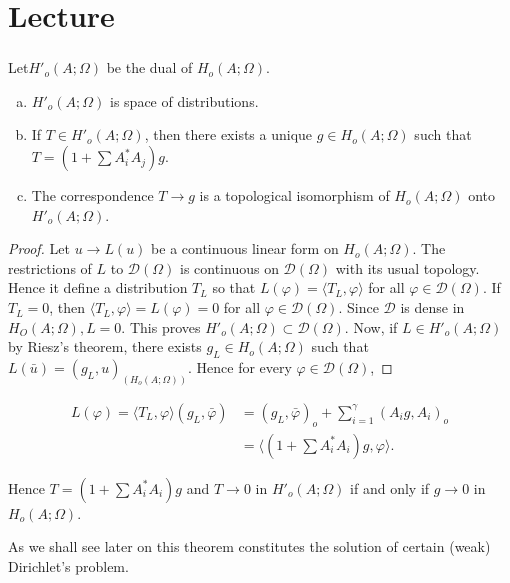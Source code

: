\chapter{Lecture}\label{lec2}

\setcounter{section}{1}

\subsection{}\label{lec2:sec1:subsec6}%

Let\pageoriginale $H'_o (A ; \Omega)$ be the dual of $H_o(A; \Omega)$. 

\setcounter{theorem}{2}
\begin{theorem}\label{lec2:sec1:subsec6:thm1.3}%
   \begin{enumerate}[a)]
   \item $H'_o (A; \Omega)$ is space of distributions.
   \item If $T \in H'_o (A ; \Omega)$, then there exists a
     unique $g \in H_o(A; \Omega)$ such that $T =(1+ \sum A^*_i
     A_j)g$. 
   \item The correspondence $T \to g$ is a topological isomorphism of
     $H_o (A; \Omega)$ onto $H'_o (A ; \Omega)$. 
   \end{enumerate}
\end{theorem}
\begin{proof}
Let $u \to L(u)$ be a continuous linear form on $H_o (A; \Omega)$. The
restrictions of $L$ to $\mathscr{D} (\Omega)$ is continuous on
$\mathscr{D}(\Omega)$ with its usual topology. Hence it define a
distribution $T_{L}$ so that $L(\varphi)= \langle T_L,
\varphi \rangle$ for all $\varphi \in \mathscr{D}(\Omega)$. If
$T_L=0$, then $\langle T_L, \varphi \rangle =L(\varphi)=0$ for all
$\varphi \in \mathscr{D}(\Omega)$. Since $\mathscr{D}$ is
dense in $H_O(A ; \Omega), L = 0$. This proves $H'_o (A ; \Omega)
\subset \mathscr{D} (\Omega)$. Now, if $L \in H'_o(A; \Omega)$
by Riesz's theorem, there exists $g_L \in H_o(A; \Omega)$ such
that $L (\bar{u})=(g_L,u)_{(H_o (A; \Omega))}$. Hence for every
$\varphi \in \mathscr{D}(\Omega)$, 
\end{proof}
\begin{align*}
L(\varphi)= \langle T_L, \varphi \rangle (g_L, \bar{\varphi})  &=(g_L,
\bar{\varphi})_o + \sum ^\gamma _{i=1} (A_i g,A_i)_o\\ 
&= \langle (1+ \sum A^*_i A_i)g, \varphi \rangle.
\end{align*}

Hence $T=(1+ \sum A^*_i A_i)g$ and $T \to 0$ in $H'_o(A; \Omega)$ if
and only if $g \to 0$ in $H_o(A; \Omega)$. 
\begin{remark*}
  As we shall see later on this theorem constitutes the solution of
  certain (weak) Dirichlet's problem. 
\end{remark*}

